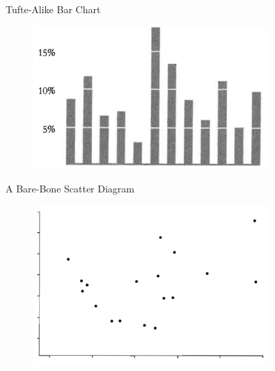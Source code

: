 \documentclass[notes, aspectratio=1610]{beamer}
\begin{document}
\begin{frame}{Tufte-Alike Bar Chart}{}
\begin{figure}
		\begin{center}
			\includegraphics[width=0.8\textwidth]{images/tufte_barchart.png}
		\end{center}
	\end{figure}

\end{frame}

\begin{frame}{A Bare-Bone Scatter Diagram}{}
\begin{figure}
		\begin{center}
			\includegraphics[width=0.8\textwidth]{images/trad_scatter.png}
		\end{center}
	\end{figure}

\end{frame}
\end{document}
